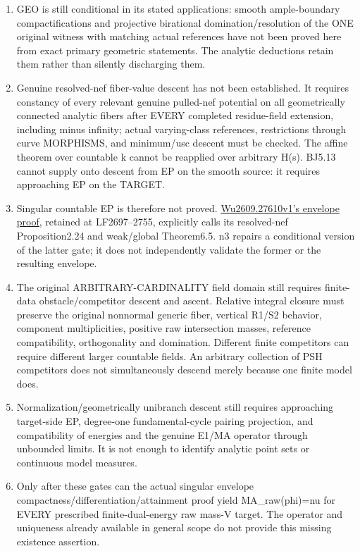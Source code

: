 \documentclass[
  10pt,
]{article}
\begin{document}
\begin{enumerate}
\def\labelenumi{\arabic{enumi}.}
\item
  GEO is still conditional in its stated applications: smooth
  ample-boundary compactifications and projective birational
  domination/resolution of the ONE original witness with matching actual
  references have not been proved here from exact primary geometric
  statements. The analytic deductions retain them rather than silently
  discharging them.
\item
  Genuine resolved-nef fiber-value descent has not been established. It
  requires constancy of every relevant genuine pulled-nef potential on
  all geometrically connected analytic fibers after EVERY completed
  residue-field extension, including minus infinity; actual
  varying-class references, restrictions through curve MORPHISMS, and
  minimum/usc descent must be checked. The affine theorem over countable
  k cannot be reapplied over arbitrary H(s). BJ5.13 cannot supply onto
  descent from EP on the smooth source: it requires approaching EP on
  the TARGET.
\item
  Singular countable EP is therefore not proved.
  \href{https://arxiv.org/pdf/2609.27610v1\#page=51}{Wu2609.27610v1's
  envelope proof}, retained at LF2697--2755, explicitly calls its
  resolved-nef Proposition2.24 and weak/global Theorem6.5. n3 repairs a
  conditional version of the latter gate; it does not independently
  validate the former or the resulting envelope.
\item
  The original ARBITRARY-CARDINALITY field domain still requires
  finite-data obstacle/competitor descent and ascent. Relative integral
  closure must preserve the original nonnormal generic fiber, vertical
  R1/S2 behavior, component multiplicities, positive raw intersection
  masses, reference compatibility, orthogonality and domination.
  Different finite competitors can require different larger countable
  fields. An arbitrary collection of PSH competitors does not
  simultaneously descend merely because one finite model does.
\item
  Normalization/geometrically unibranch descent still requires
  approaching target-side EP, degree-one fundamental-cycle pairing
  projection, and compatibility of energies and the genuine E1/MA
  operator through unbounded limits. It is not enough to identify
  analytic point sets or continuous model measures.
\item
  Only after these gates can the actual singular envelope
  compactness/differentiation/attainment proof yield MA\_raw(phi)=nu for
  EVERY prescribed finite-dual-energy raw mass-V target. The operator
  and uniqueness already available in general scope do not provide this
  missing existence assertion.
\end{enumerate}
\end{document}
